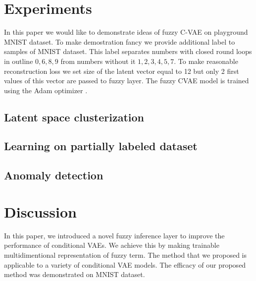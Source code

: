 \documentclass[runningheads]{llncs}
\begin{document}
\section{Experiments}

In this paper we would like to demonstrate ideas of fuzzy C-VAE on playground MNIST dataset.
To make demostration fancy we provide additional label to samples of MNIST dataset.
This label separates numbers with closed round loops in outline $0,6,8,9$ from numbers without it $1,2,3,4,5,7$.
To make reasonable reconstruction loss we set size of the latent vector equal to 12 but only 2 first values of this vector are passed to fuzzy layer.
The fuzzy CVAE model is trained using the Adam optimizer \cite{kingma2017adam}.

\subsection{Latent space clusterization}

\subsection{Learning on partially labeled dataset}

\subsection{Anomaly detection}

\section{Discussion}

In this paper, we introduced a novel fuzzy inference layer to improve the performance of conditional VAEs. 
We achieve this by making trainable multidimentional representation of fuzzy term.
The method that we proposed is applicable to a variety of conditional VAE models. 
The efficacy of our proposed method was demonstrated on MNIST dataset. 



\end{document}
